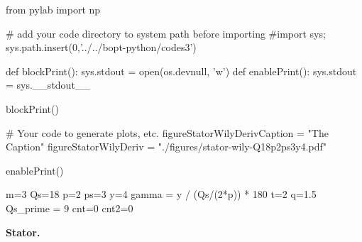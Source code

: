 \documentclass{scrartcl} %
\begin{document}
\begin{pycode}
from pylab import np

# add your code directory to system path before importing
#import sys; sys.path.insert(0,'../../bopt-python/codes3')

def blockPrint():
    sys.stdout = open(os.devnull, 'w')
def enablePrint():
    sys.stdout = sys.__stdout__

blockPrint()

# Your code to generate plots, etc.
figureStatorWilyDerivCaption = "The Caption"
figureStatorWilyDeriv = "./figures/stator-wily-Q18p2ps3y4.pdf"

enablePrint()
\end{pycode}

\newcommand*{\DefineFigureNames}{%
  \providecommand*{\figureStatorWilyDeriv}{}%
}
\DefineFigureNames


\begin{pycode}
m=3
Qs=18
p=2
ps=3
y=4
gamma = y / (Qs/(2*p)) * 180
t=2
q=1.5
Qs_prime = 9
cnt=0
cnt2=0
\end{pycode}













\textbf{Stator.}
\end{document}
